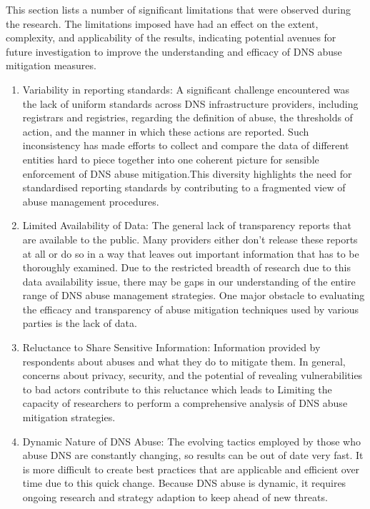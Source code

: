 This section lists a number of significant limitations that were observed during the research. The limitations imposed have had an effect on the extent, complexity, and applicability of the results, indicating potential avenues for future investigation to improve the understanding and efficacy of DNS abuse mitigation measures.

\begin{enumerate}
    \item Variability in reporting standards: A significant challenge encountered was the lack of uniform standards across DNS infrastructure providers, including registrars and registries, regarding the definition of abuse, the thresholds of action, and the manner in which these actions are reported. Such inconsistency has made efforts to collect and compare the data of different entities hard to piece together into one coherent picture for sensible enforcement of DNS abuse mitigation.This diversity highlights the need for standardised reporting standards by contributing to a fragmented view of abuse management procedures.

    \item Limited Availability of Data: The general lack of transparency reports that are available to the public. Many providers either don't release these reports at all or do so in a way that leaves out important information that has to be thoroughly examined. Due to the restricted breadth of research due to this data availability issue, there may be gaps in our understanding of the entire range of DNS abuse management strategies. One major obstacle to evaluating the efficacy and transparency of abuse mitigation techniques used by various parties is the lack of data.

    \item Reluctance to Share Sensitive Information: Information provided by respondents about abuses and what they do to mitigate them. In general, concerns about privacy, security, and the potential of revealing vulnerabilities to bad actors contribute to this reluctance which leads to Limiting the capacity of researchers to perform a comprehensive analysis of DNS abuse mitigation strategies.
    
    \item Dynamic Nature of DNS Abuse: The evolving tactics employed by those who abuse DNS are constantly changing, so results can be out of date very fast. It is more difficult to create best practices that are applicable and efficient over time due to this quick change. Because DNS abuse is dynamic, it requires ongoing research and strategy adaption to keep ahead of new threats.


\end{enumerate}
